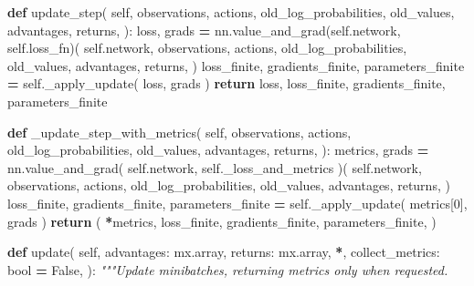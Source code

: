 \documentclass[
  chinese,
  11pt,
  letterpaper,
]{article}
\newenvironment{Shaded}{\begin{snugshade}}{\end{snugshade}}
\newcommand{\BuiltInTok}[1]{#1}
\newcommand{\CommentTok}[1]{\textcolor[rgb]{0.56,0.35,0.01}{\textit{#1}}}
\newcommand{\ControlFlowTok}[1]{\textcolor[rgb]{0.13,0.29,0.53}{\textbf{#1}}}
\newcommand{\DecValTok}[1]{\textcolor[rgb]{0.00,0.00,0.81}{#1}}
\newcommand{\KeywordTok}[1]{\textcolor[rgb]{0.13,0.29,0.53}{\textbf{#1}}}
\newcommand{\NormalTok}[1]{#1}
\newcommand{\OperatorTok}[1]{\textcolor[rgb]{0.81,0.36,0.00}{\textbf{#1}}}
\newcommand{\VariableTok}[1]{\textcolor[rgb]{0.00,0.00,0.00}{#1}}
\renewenvironment{Shaded}{\par\smallskip}{\par\smallskip}
\begin{document}
\begin{Shaded}
\begin{Highlighting}[]
    \KeywordTok{def}\NormalTok{ update\_step(}
        \VariableTok{self}\NormalTok{,}
\NormalTok{        observations,}
\NormalTok{        actions,}
\NormalTok{        old\_log\_probabilities,}
\NormalTok{        old\_values,}
\NormalTok{        advantages,}
\NormalTok{        returns,}
\NormalTok{    ):}
\NormalTok{        loss, grads }\OperatorTok{=}\NormalTok{ nn.value\_and\_grad(}\VariableTok{self}\NormalTok{.network, }\VariableTok{self}\NormalTok{.loss\_fn)(}
            \VariableTok{self}\NormalTok{.network,}
\NormalTok{            observations,}
\NormalTok{            actions,}
\NormalTok{            old\_log\_probabilities,}
\NormalTok{            old\_values,}
\NormalTok{            advantages,}
\NormalTok{            returns,}
\NormalTok{        )}
\NormalTok{        loss\_finite, gradients\_finite, parameters\_finite }\OperatorTok{=} \VariableTok{self}\NormalTok{.\_apply\_update(}
\NormalTok{            loss, grads}
\NormalTok{        )}
        \ControlFlowTok{return}\NormalTok{ loss, loss\_finite, gradients\_finite, parameters\_finite}

    \KeywordTok{def}\NormalTok{ \_update\_step\_with\_metrics(}
        \VariableTok{self}\NormalTok{,}
\NormalTok{        observations,}
\NormalTok{        actions,}
\NormalTok{        old\_log\_probabilities,}
\NormalTok{        old\_values,}
\NormalTok{        advantages,}
\NormalTok{        returns,}
\NormalTok{    ):}
\NormalTok{        metrics, grads }\OperatorTok{=}\NormalTok{ nn.value\_and\_grad(}
            \VariableTok{self}\NormalTok{.network, }\VariableTok{self}\NormalTok{.\_loss\_and\_metrics}
\NormalTok{        )(}
            \VariableTok{self}\NormalTok{.network,}
\NormalTok{            observations,}
\NormalTok{            actions,}
\NormalTok{            old\_log\_probabilities,}
\NormalTok{            old\_values,}
\NormalTok{            advantages,}
\NormalTok{            returns,}
\NormalTok{        )}
\NormalTok{        loss\_finite, gradients\_finite, parameters\_finite }\OperatorTok{=} \VariableTok{self}\NormalTok{.\_apply\_update(}
\NormalTok{            metrics[}\DecValTok{0}\NormalTok{], grads}
\NormalTok{        )}
        \ControlFlowTok{return}\NormalTok{ (}
            \OperatorTok{*}\NormalTok{metrics,}
\NormalTok{            loss\_finite,}
\NormalTok{            gradients\_finite,}
\NormalTok{            parameters\_finite,}
\NormalTok{        )}

    \KeywordTok{def}\NormalTok{ update(}
        \VariableTok{self}\NormalTok{,}
\NormalTok{        advantages: mx.array,}
\NormalTok{        returns: mx.array,}
        \OperatorTok{*}\NormalTok{,}
\NormalTok{        collect\_metrics: }\BuiltInTok{bool} \OperatorTok{=} \VariableTok{False}\NormalTok{,}
\NormalTok{    ):}
        \CommentTok{"""Update minibatches, returning metrics only when requested.}


\end{Highlighting}
\end{Shaded}
\end{document}
